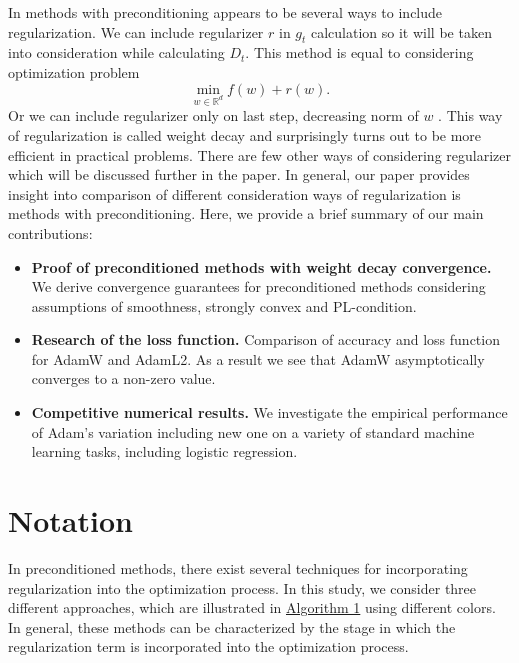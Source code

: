 \documentclass{article}
\begin{document}
In methods with preconditioning appears to be several ways to include regularization.
We can include regularizer $r$ in $g_t$ calculation so it will be taken into consideration while calculating $D_t$. This method is equal to considering optimization problem 
\begin{equation}
	\min_{w \in \mathbb{R}^d} f(w) + r(w).
\end{equation}
Or we can include regularizer only on last step, decreasing norm of $w$ \citep{loshchilov2017decoupled}.
This way of regularization is called weight decay and surprisingly turns out to be more efficient in practical problems.
There are few other ways of considering regularizer which will be discussed further in the paper.
In general, our paper provides insight into comparison of different consideration ways of regularization is methods with preconditioning. Here, we provide a brief summary of our main contributions:

\begin{itemize}
    \item \textbf{Proof of preconditioned methods with weight decay convergence.}  We derive convergence guarantees for preconditioned methods considering assumptions of smoothness, strongly convex and PL-condition.
    
    \item \textbf{Research of the loss function.} Comparison of accuracy and loss function for AdamW and AdamL2. As a result we see that AdamW asymptotically converges to a non-zero value.
    
    \item \textbf{Competitive numerical results.} We investigate the empirical performance of Adam's variation including new one on a variety of standard machine learning tasks, including logistic regression.
\end{itemize}
\fi

\section{Notation}
In preconditioned methods, there exist several techniques for incorporating regularization into the optimization process.
In this study, we consider three different approaches, which are illustrated in \hyperref[alg:precond]{Algorithm 1} using different colors.
In general, these methods can be characterized by the stage in which the regularization term is incorporated into the optimization process.
\end{document}
